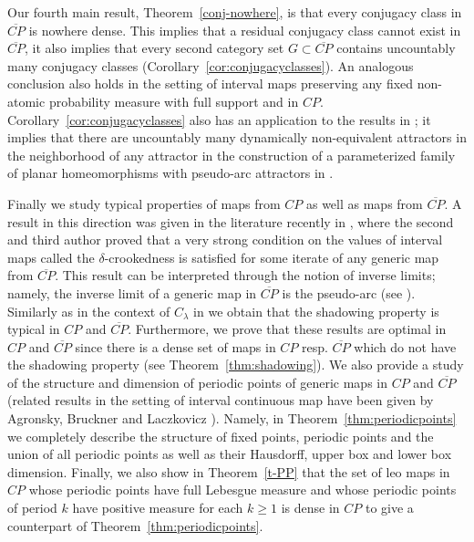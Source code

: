 \documentclass[12pt, a4paper]{amsart}
\def\ge{\geqslant}
\newcommand{\?}{{\bf ???}}
\def\CP{\overline{CP}}
\begin{document}
Our fourth main result, Theorem~\ref{conj-nowhere}, is that every conjugacy class in $\CP$ is nowhere dense.
This implies that a residual conjugacy class cannot exist in $\CP$, it also implies that 
every second category set $G\subset \CP$ contains uncountably many conjugacy classes (Corollary~\ref{cor:conjugacyclasses}).   An analogous conclusion also holds in the setting of interval maps preserving any fixed non-atomic probability measure with full support and in $CP$.
Corollary~\ref{cor:conjugacyclasses} also 
has an application to the results in \cite{CO}; it
implies that there are uncountably many dynamically non-equivalent attractors in the neighborhood of any attractor 
in the construction of a
parameterized family of planar homeomorphisms with pseudo-arc attractors in \cite{CO}.

Finally we study typical properties of maps from  $CP$ as well as maps from $\CP$. A result in this direction was given in the literature recently in \cite{CO}, where the second and third author proved that a very strong condition on the values of interval maps called the $\delta$-crookedness is satisfied for some iterate of any generic map from $\CP$. This result can be interpreted through the notion of inverse limits; namely, the inverse limit of a generic map in $\CP$ is the pseudo-arc (see \cite[Theorem 1.3]{CO}). Similarly as in the context of $C_{\lambda}$ in \cite{BCOT} we obtain that the shadowing property is typical in $CP$ and $\CP$. Furthermore, we prove that these results are optimal in $CP$ and $\CP$ since there is a dense set of maps in $CP$ resp. $\CP$ which do not have the shadowing property (see Theorem~\ref{thm:shadowing}). We also provide a study of the structure and dimension of periodic points of generic maps in  $CP$ and $\CP$ (related results in the setting of interval continuous map have been given by Agronsky, Bruckner and Laczkovicz \cite{ABL}). Namely, in Theorem~\ref{thm:periodicpoints} we completely describe the structure of fixed points, periodic points and the union of all periodic points as well as their Hausdorff, upper box and lower box dimension. Finally, we also show in Theorem~\ref{t-PP} that the set of leo maps in $CP$ whose periodic points have full Lebesgue measure and whose periodic points of period $k$ have positive measure for each $k \ge 1$ is dense in $CP$ to give a counterpart of Theorem~\ref{thm:periodicpoints}. 
\end{document}
